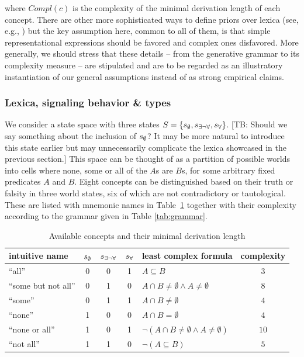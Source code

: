 \documentclass[a4paper]{article}
\newcommand{\tb}[1]{\textcolor[rgb]{.8,.33,.0}{[TB: #1]}}%
\newcommand{\set}[1]{\left\{#1\right\}}
\newcommand{\States}{\ensuremath{S}\xspace}		%
\newcommand{\state}{\ensuremath{s}\xspace}		%
\newcommand{\mystate}[1]{\ensuremath{\state_{\text{#1}}}\xspace} %
\newcommand{\ssome}{\mystate{\ensuremath{\exists\neg\forall}}}
\newcommand{\sall}{\mystate{\ensuremath{\forall}}}
\newcommand{\snone}{\mystate{\ensuremath{\emptyset}}}
\begin{document}
where $Compl(c)$ is the complexity of the minimal derivation length of each concept. There are other more sophisticated ways to define priors over lexica (see, e.g., \citealt{goodman+etal:2008, piantadosi+etal:2012a}) but the key assumption here, common to all of them, is that simple representational expressions should be favored and complex ones disfavored. More generally, we should stress that these details -- from the generative grammar to its complexity measure -- are stipulated and are to be regarded as an illustratory instantiation of our general assumptions instead of as strong empirical claims. 




\subsubsection{Lexica, signaling behavior \& types}
We consider a state space with three states $\States = \set{\snone, \ssome, \sall}$. \tb{Should we say something about the inclusion of $\snone$? It may be more natural to introduce this state earlier but may unnecessarily complicate the lexica showcased in the previous section.} This space can be
thought of as a partition of possible worlds into cells where none, some or all of the $A$s are
$B$s, for some arbitrary fixed predicates $A$ and $B$. Eight concepts can be distinguished
based on their truth or falsity in three world states, six of which are not contradictory
 or tautological. These are listed with mnemonic names in
Table~\ref{tab:concepts} together with their complexity according to the grammar given in Table \ref{tab:grammar}.

\begin{table}
  \centering
\begin{center}
  \begin{tabular}{lccclc}
    \toprule
    intuitive name
    & \snone
    & \ssome
    & \sall
    & least complex formula
    & complexity
    \\ \midrule
    ``all''
    & 0
    & 0
    & 1
    & $A \subseteq B$
    & $3$
    \\
    ``some but not all''
    & 0
    & 1
    & 0
    & $A \cap B \neq \emptyset \wedge A \neq \emptyset$
    & $8$
    \\    
    ``some''
    & 0
    & 1
    & 1
    & $A \cap B \neq \emptyset$
    & $4$
    \\
    ``none''
    & 1
    & 0
    & 0
    & $A \cap B = \emptyset$
    & $4$
    \\
    ``none or all''
    & 1
    & 0
    & 1
    & $\neg(A \cap B \neq \emptyset \wedge A \neq \emptyset)$
    & $10$
    \\
    ``not all''
    & 1
    & 1
    & 0
    & $\neg (A \subseteq B)$
    & $5$
    \\
    \bottomrule
  \end{tabular}
\end{center}
\caption{Available concepts and their minimal derivation length}
\label{tab:concepts}
\end{table}
\end{document}
